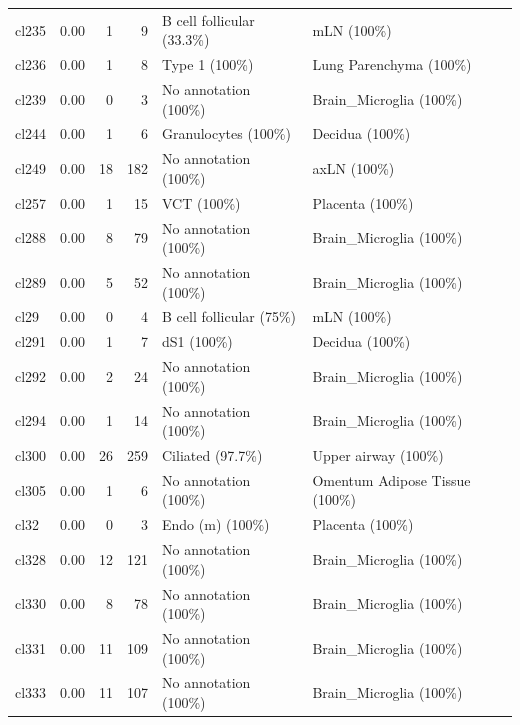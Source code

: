 \begin{table}[ht!]
\begin{tabular}{lrrrll}
  cl235 & 0.00 &   1 &   9 & B cell follicular (33.3\%) & mLN (100\%) \\ 
  cl236 & 0.00 &   1 &   8 & Type 1 (100\%) & Lung Parenchyma (100\%) \\ 
  cl239 & 0.00 &   0 &   3 & No annotation (100\%) & Brain\_Microglia (100\%) \\ 
  cl244 & 0.00 &   1 &   6 & Granulocytes (100\%) & Decidua (100\%) \\ 
  cl249 & 0.00 &  18 & 182 & No annotation (100\%) & axLN (100\%) \\ 
  cl257 & 0.00 &   1 &  15 & VCT (100\%) & Placenta (100\%) \\ 
  cl288 & 0.00 &   8 &  79 & No annotation (100\%) & Brain\_Microglia (100\%) \\ 
  cl289 & 0.00 &   5 &  52 & No annotation (100\%) & Brain\_Microglia (100\%) \\ 
  cl29 & 0.00 &   0 &   4 & B cell follicular (75\%) & mLN (100\%) \\ 
  cl291 & 0.00 &   1 &   7 & dS1 (100\%) & Decidua (100\%) \\ 
  cl292 & 0.00 &   2 &  24 & No annotation (100\%) & Brain\_Microglia (100\%) \\ 
  cl294 & 0.00 &   1 &  14 & No annotation (100\%) & Brain\_Microglia (100\%) \\ 
  cl300 & 0.00 &  26 & 259 & Ciliated (97.7\%) & Upper airway (100\%) \\ 
  cl305 & 0.00 &   1 &   6 & No annotation (100\%) & Omentum Adipose Tissue (100\%) \\ 
  cl32 & 0.00 &   0 &   3 & Endo (m) (100\%) & Placenta (100\%) \\ 
  cl328 & 0.00 &  12 & 121 & No annotation (100\%) & Brain\_Microglia (100\%) \\ 
  cl330 & 0.00 &   8 &  78 & No annotation (100\%) & Brain\_Microglia (100\%) \\ 
  cl331 & 0.00 &  11 & 109 & No annotation (100\%) & Brain\_Microglia (100\%) \\ 
  cl333 & 0.00 &  11 & 107 & No annotation (100\%) & Brain\_Microglia (100\%) \\ 
   \bottomrule
\end{tabular}
\end{table}


